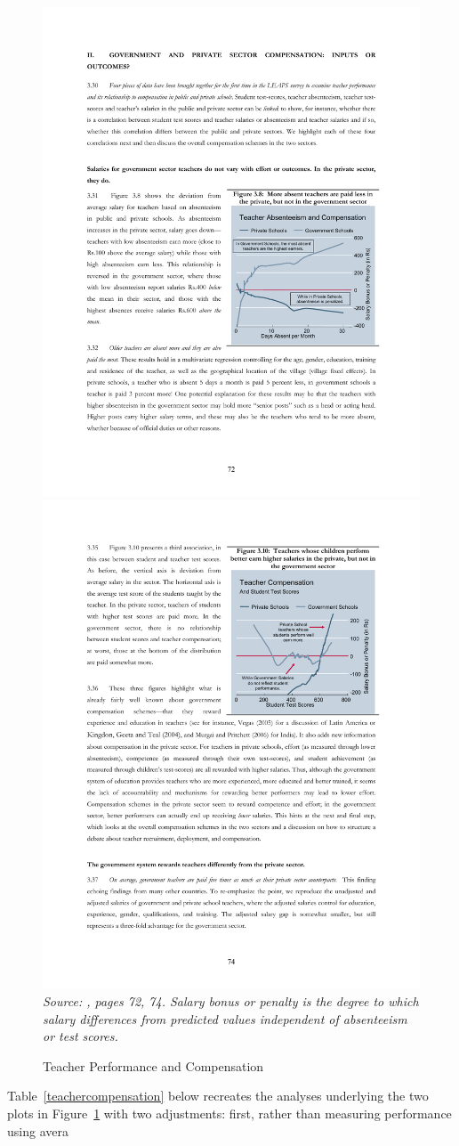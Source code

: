\documentclass[Eubank_pk_ethnic_sorting.tex]{subfiles}
\begin{document}
\begin{figure}[htb]
	\begin{center}
	\caption{Teacher Performance and Compensation}\label{payandabsenteeism}
	\includegraphics[scale=0.82]{../graphs/absenteeism_and_pay.pdf} \includegraphics[scale=0.8]{../graphs/compensation_scores.pdf}\\
	\emph{Source: \cite{Andrabi:2007we}, pages 72, 74. Salary bonus or penalty is the degree to which salary differences from predicted values independent of absenteeism or test scores.}
	\end{center}
\end{figure}

Table~\ref{teachercompensation} below recreates the analyses underlying the two plots in Figure~\ref{payandabsenteeism} with two adjustments: first, rather than measuring performance using avera
\end{document}
